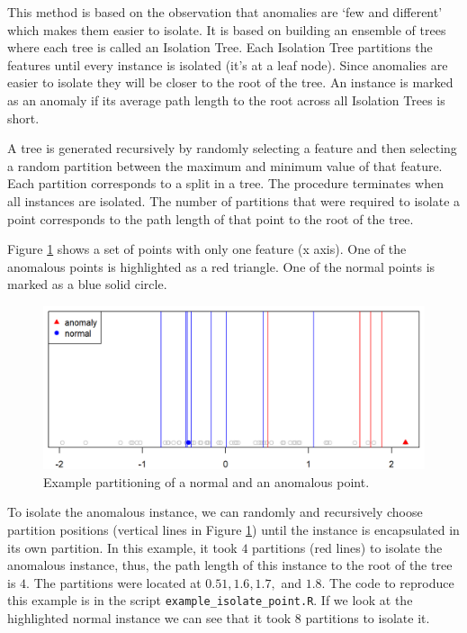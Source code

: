 \documentclass[
  11pt,
]{krantz}
\begin{document}
This method is based on the observation that anomalies are `few and different' which makes them easier to isolate. It is based on building an ensemble of trees where each tree is called an Isolation Tree. Each Isolation Tree partitions the features until every instance is isolated (it's at a leaf node). Since anomalies are easier to isolate they will be closer to the root of the tree. An instance is marked as an anomaly if its average path length to the root across all Isolation Trees is short.

A tree is generated recursively by randomly selecting a feature and then selecting a random partition between the maximum and minimum value of that feature. Each partition corresponds to a split in a tree. The procedure terminates when all instances are isolated. The number of partitions that were required to isolate a point corresponds to the path length of that point to the root of the tree.

Figure \ref{fig:partitionExamle} shows a set of points with only one feature (x axis). One of the anomalous points is highlighted as a red triangle. One of the normal points is marked as a blue solid circle.

\begin{figure}

{\centering \includegraphics[width=1\linewidth]{images/anomaly_example} 

}

\caption{Example partitioning of a normal and an anomalous point.}\label{fig:partitionExamle}
\end{figure}

To isolate the anomalous instance, we can randomly and recursively choose partition positions (vertical lines in Figure \ref{fig:partitionExamle}) until the instance is encapsulated in its own partition. In this example, it took \(4\) partitions (red lines) to isolate the anomalous instance, thus, the path length of this instance to the root of the tree is \(4\). The partitions were located at \(0.51, 1.6, 1.7,\) and \(1.8\). The code to reproduce this example is in the script \texttt{example\_isolate\_point.R}. If we look at the highlighted normal instance we can see that it took \(8\) partitions to isolate it.
\end{document}
